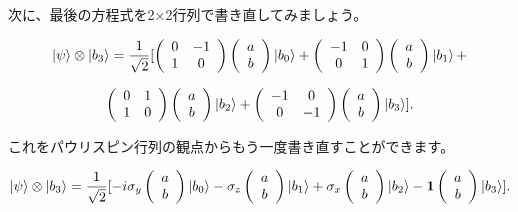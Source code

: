 次に、最後の方程式を2×2行列で書き直してみましょう。

\begin{equation}
\label{190}
\ket{\psi} \otimes \ket{b_3}
=
\frac{1}{\sqrt{2}}
[ 
\left( \begin{array}{cc}
 0 & -1 \\
 1 & 0
\end{array} \right)  
\left( \begin{array}{c}
 a \\
 b
\end{array} \right) 
\ket{b_0}
+
\left( \begin{array}{cc}
 -1 & 0 \\
 0 & 1
\end{array} \right)  
\left( \begin{array}{c}
 a \\
 b
\end{array} \right)  \ket{b_1}
+
\end{equation}

\begin{equation}
\label{191}
\left( \begin{array}{cc}
 0 & 1 \\
 1 & 0
\end{array} \right)  
\left( \begin{array}{c}
 a \\
 b
\end{array} \right) 
\ket{b_2}
+
\left( \begin{array}{cc}
 -1 & 0 \\
 0 & -1
\end{array} \right)  
\left( \begin{array}{c}
 a \\
 b
\end{array} \right)  \ket{b_3}
].
\end{equation}

これをパウリスピン行列の観点からもう一度書き直すことができます。

\begin{equation}
\label{192}
\ket{\psi} \otimes \ket{b_3}
=
\frac{1}{\sqrt{2}}
[ 
-i \sigma_y
\left( \begin{array}{c}
 a \\
 b
\end{array} \right) 
\ket{b_0}
-
\sigma_z
\left( \begin{array}{c}
 a \\
 b
\end{array} \right)  \ket{b_1}
+
\sigma_x
\left( \begin{array}{c}
 a \\
 b
\end{array} \right)  \ket{b_2}
-
\mathbf{1}
\left( \begin{array}{c}
 a \\
 b
\end{array} \right)  \ket{b_3} ].
\end{equation}

